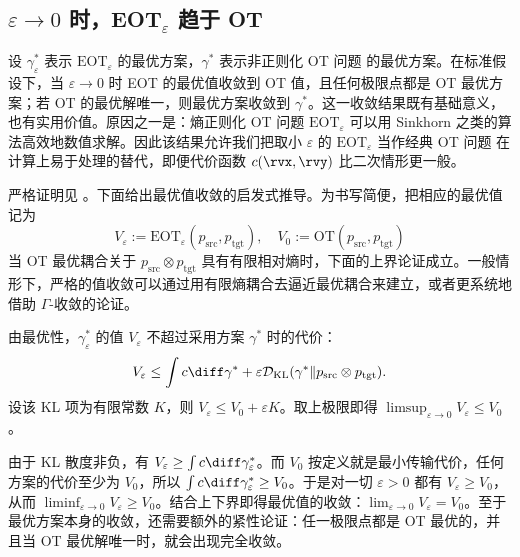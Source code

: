 \subsection{$\varepsilon\to 0$ 时，EOT$_\varepsilon$ 趋于 OT}\label{subsec:eot-ot}


设 $\gamma^*_\varepsilon$ 表示 $\mathrm{EOT}_\varepsilon$ 的最优方案，$\gamma^*$ 表示非正则化 OT 问题  的最优方案。在标准假设下，当 $\varepsilon\to0$ 时 EOT 的最优值收敛到 OT 值，且任何极限点都是 OT 最优方案；若 OT 的最优解唯一，则最优方案收敛到 $\gamma^*$。这一收敛结果既有基础意义，也有实用价值。原因之一是：熵正则化 OT 问题 $\mathrm{EOT}_\varepsilon$ 可以用 Sinkhorn 之类的算法高效地数值求解。因此该结果允许我们把取小 $\varepsilon$ 的 $\mathrm{EOT}_\varepsilon$ 当作经典 OT 问题  在计算上易于处理的替代，即便代价函数 $c(\rvx, \rvy)$ 比二次情形更一般。


{严格证明见 \citep{mikami2008optimal, peyre2019computational}。下面给出最优值收敛的启发式推导。为书写简便，把相应的最优值记为
\[
V_\varepsilon := \mathrm{EOT}_\varepsilon(p_{\mathrm{src}}, p_{\mathrm{tgt}}), \quad
V_0 := \mathrm{OT}(p_{\mathrm{src}}, p_{\mathrm{tgt}})
\]
当 OT 最优耦合关于 $p_{\mathrm{src}}\otimes p_{\mathrm{tgt}}$ 具有有限相对熵时，下面的上界论证成立。一般情形下，严格的值收敛可以通过用有限熵耦合去逼近最优耦合来建立，或者更系统地借助 $\Gamma$-收敛的论证。

 由最优性，$\gamma^*_\varepsilon$ 的值 $V_\varepsilon$ 不超过采用方案 $\gamma^*$ 时的代价：
\[
    V_\varepsilon \leq \int c  \diff\gamma^* + \varepsilon \mathcal{D}_{\text{KL}}(\gamma^* \| p_{\mathrm{src}} \otimes p_{\mathrm{tgt}}).
\]
设该 KL 项为有限常数 $K$，则 $V_\varepsilon \leq V_0 + \varepsilon K$。取上极限即得 $\limsup_{\varepsilon \to 0} V_\varepsilon \leq V_0$。

 由于 KL 散度非负，有 $V_\varepsilon \geq \int c  \diff\gamma^*_\varepsilon$。而 $V_0$ 按定义就是最小传输代价，任何方案的代价至少为 $V_0$，所以 $\int c  \diff\gamma^*_\varepsilon \geq V_0$。于是对一切 $\varepsilon > 0$ 都有 $V_\varepsilon \geq V_0$，从而 $\liminf_{\varepsilon \to 0} V_\varepsilon \geq V_0$。结合上下界即得最优值的收敛：$\lim_{\varepsilon \to 0} V_\varepsilon = V_0$。至于最优方案本身的收敛，还需要额外的紧性论证：任一极限点都是 OT 最优的，并且当 OT 最优解唯一时，就会出现完全收敛。

 }


